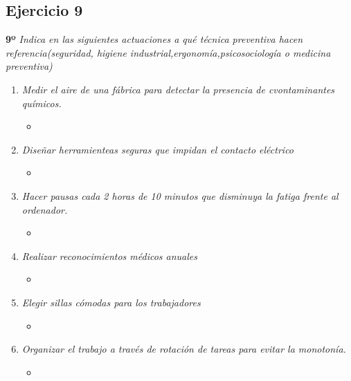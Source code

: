 \documentclass{article}
\begin{document}
        \subsection{Ejercicio 9}
          \textbf{9º}  \textit{Indica en las siguientes actuaciones a qué técnica preventiva hacen referencia(seguridad, higiene industrial,ergonomía,psicosociología o medicina preventiva)}
          \\
          \begin{enumerate}[label=(\alph*)]
            \item \textit{Medir el aire de una fábrica para detectar la presencia de cvontaminantes químicos.}
              \begin{itemize}
                \item 
              \end{itemize}
            \item \textit{Diseñar herramienteas seguras que impidan el contacto eléctrico}
              \begin{itemize}
                \item 
              \end{itemize}
            \item \textit{Hacer pausas cada 2 horas de 10 minutos que disminuya la fatiga frente al ordenador.}
              \begin{itemize}
                \item 
              \end{itemize}
            \item \textit{Realizar reconocimientos médicos anuales}
              \begin{itemize}
                \item 
              \end{itemize}
            \item \textit{Elegir sillas cómodas para los trabajadores}
              \begin{itemize}
                \item 
              \end{itemize}
            \item \textit{Organizar el trabajo a través de rotación de tareas para evitar la monotonía.}
              \begin{itemize}
                \item
              \end{itemize}
          \end{enumerate}
  \newpage
\end{document}
